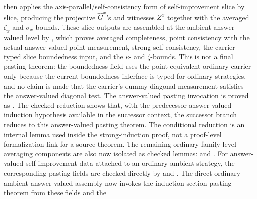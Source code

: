 		then applies the axis-parallel/self-consistency form of self-improvement
		slice by slice, producing the projective \(\widehat G^x\)'s and
		witnesses \(Z^x\) together with the averaged \(\zeta_x\) and
		\(\sigma_x\) bounds.  These slice outputs are assembled at the
		ambient answer-valued level by
		,
		which proves averaged completeness, point consistency with the actual
		answer-valued point measurement, strong self-consistency, the carrier-typed
		slice boundedness input, and the \(\kappa\)- and \(\zeta\)-bounds.  This
		is not a final pasting theorem: the boundedness field uses the
		point-equivalent ordinary carrier only because the current boundedness
		interface is typed for ordinary strategies, and no claim is made that the
		carrier's dummy diagonal measurement satisfies the answer-valued diagonal
		test.  The answer-valued pasting invocation is proved as
		.
		The checked reduction
		shows that, with the predecessor answer-valued induction hypothesis
		available in the successor context, the successor branch reduces to this
		answer-valued pasting theorem.  The conditional reduction is an internal
		lemma used inside the strong-induction proof, not a proof-level
		formalization link for a source theorem.  The remaining
		ordinary family-level averaging components are also now isolated as checked
		lemmas:
	and
	.
	For answer-valued self-improvement data attached to an ordinary ambient
	strategy, the corresponding pasting fields are checked directly by
	and
	.
	The direct ordinary-ambient answer-valued assembly
	now invokes the induction-section pasting theorem from these fields and the
